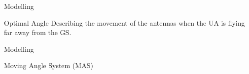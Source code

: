 \begin{frame}{Modelling}
  \begin{block}{Optimal Angle}
      Describing the movement of the antennas when the UA is flying far away from the GS. 
    \end{block}

  \begin{figure}[H]
    \centerline{
    }
  \end{figure}
\end{frame}

\begin{frame}{Modelling}{}

  \begin{block}{Moving Angle System (MAS)}

  \end{block}

\end{frame}
